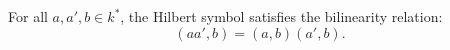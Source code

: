 For all $a, a', b \in k^*$, the Hilbert symbol satisfies the bilinearity relation:
$$
(a a', b) = (a, b)(a', b).
$$
